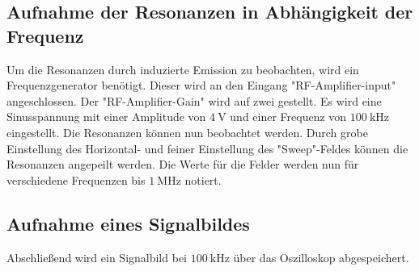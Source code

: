 \subsection{Aufnahme der Resonanzen in Abhängigkeit der Frequenz}
Um die Resonanzen durch induzierte Emission zu beobachten, wird ein Frequenzgenerator benötigt.
Dieser wird an den Eingang "RF-Amplifier-input" angeschlossen.
Der "RF-Amplifier-Gain" wird auf zwei gestellt.
Es wird eine Sinusspannung mit einer Amplitude von $\SI{4}{\volt}$ und einer Frequenz von $\SI{100}{\kilo\hertz}$ eingestellt.
Die Resonanzen können nun beobachtet werden.
Durch grobe Einstellung des Horizontal- und feiner Einstellung des "Sweep"-Feldes können die Resonanzen angepeilt werden.
Die Werte für die Felder werden nun für verschiedene Frequenzen bis $\SI{1}{\mega\hertz}$ notiert.

\subsection{Aufnahme eines Signalbildes}
Abschließend wird ein Signalbild bei $\SI{100}{\kilo\hertz}$ über das Oszilloskop abgespeichert.
